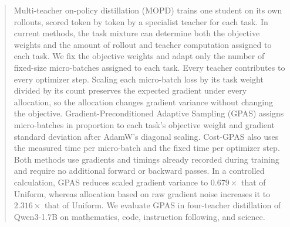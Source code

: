 \begin{abstract}

Multi-teacher on-policy distillation (MOPD) trains one student on its own
rollouts, scored token by token by a specialist teacher for each task. In
current methods, the task mixture can determine both the objective weights and
the amount of rollout and teacher computation assigned to each task. We fix the
objective weights and adapt only the number of fixed-size micro-batches assigned
to each task. Every teacher contributes to every optimizer step. Scaling each
micro-batch loss by its task weight divided by its count preserves the expected
gradient under every allocation, so the allocation changes gradient variance
without changing the objective. Gradient-Preconditioned Adaptive Sampling
(GPAS) assigns micro-batches in proportion to each task's objective weight and
gradient standard deviation after AdamW's diagonal scaling. Cost-GPAS also uses
the measured time per micro-batch and the fixed time per optimizer step. Both
methods use gradients and timings already recorded during training and require
no additional forward or backward passes. In a controlled calculation, GPAS
reduces scaled gradient variance to $0.679\times$ that of Uniform, whereas
allocation based on raw gradient noise increases it to $2.316\times$ that of
Uniform. We evaluate GPAS in four-teacher distillation of Qwen3-1.7B on
mathematics, code, instruction following, and science.

\end{abstract}
